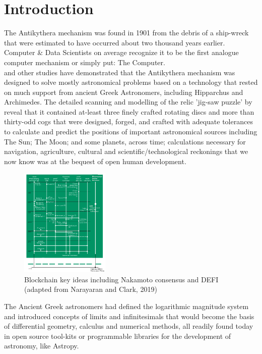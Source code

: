 \documentclass[final,5p,times,twocolumn,authoryear]{elsarticle}
\begin{document}
\section{Introduction}
\label{sec:intro}
%
 The Antikythera mechanism was found in 1901 from the debris of a ship-wreck that were estimated to have occurred about two thousand years earlier. Computer \& Data Scientists on average recognize it to be the first analogue computer mechanism or simply put: The Computer.\\ \citet{Freeth2021} and other studies have demonstrated that the Antikythera mechanism was designed to solve mostly astronomical problems based on a technology that rested on much support from ancient Greek Astronomers, including Hipparchus and Archimedes. The detailed scanning and modelling of the relic 'jig-saw puzzle' by \citet{Freeth2021} reveal that it contained at-least three finely crafted rotating discs and more than thirty-odd cogs that were designed, forged, and crafted with adequate tolerances to calculate and predict the positions of important astronomical sources including The Sun; The Moon; and some planets, across time; calculations necessary for navigation, agriculture, cultural and scientific/technological reckonings that we now know was at the bequest of open human development.
 
 \begin{figure}
    \centering
    \includegraphics[width=0.38\textwidth]{narayanan3.png}
    \vspace*{-0.3cm}
    \caption{Blockchain key ideas including Nakamoto consensus and DEFI (adapted from Narayaran and Clark, 2019)}
    \label{fig:narayanan}
\end{figure}
 
 The Ancient Greek astronomers had defined the logarithmic magnitude system and introduced concepts of limits and infinitesimals that would become the basis of differential geometry, calculus and numerical methods, all readily found today in open source tool-kits or programmable libraries for the development of astronomy, like Astropy.
 
\end{document}
